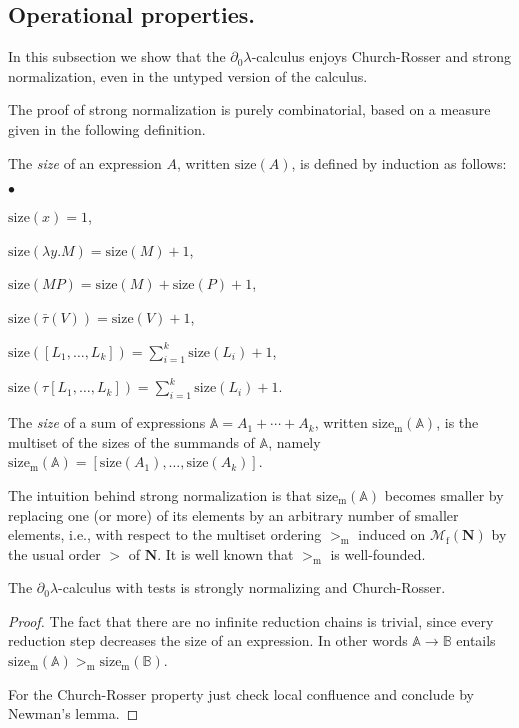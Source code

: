 \documentclass{LMCS}
\newcommand{\size}[1]{\mathrm{size}(#1)}
\newcommand\msize[1]{\mathrm{size_m}(#1)}
\newcommand{\mge}{>_{\mathrm{m}}}
\newcommand{\nat}{\mathbf{N}}
\newcommand{\bag}[1]{[#1]}
\newcommand{\dzlam}{\ensuremath{\partial_0\lambda}}
\newcommand{\lam}{\ensuremath{\lambda}}
\newcommand{\Mfin}[1]{\mathcal{M}_{\mathrm{f}}(#1)}
\newcommand{\sA}{\mathbb{A}}
\newcommand{\sB}{\mathbb{B}}
\newcommand{\gt}{\ensuremath{\tau}}
\newcommand{\gto}{\ensuremath{\bar\tau}}
\begin{document}
\subsection{Operational properties.} In this subsection we show that the  \dzlam-calculus enjoys Church-Rosser 
and strong normalization, even in the untyped version of the calculus.

The proof of strong normalization is purely combinatorial, based on a measure given in the following definition.

\begin{defi} The \emph{size} of an expression $A$, written $\size{A}$, is defined by induction as follows:
\begin{iteMize}{$\bullet$}
\item $\size{x} = 1$,
\item $\size{\lam y.M} = \size{M} +1$, 
\item $\size{MP} = \size{M} + \size{P} + 1$,
\item $\size{\gto(V)} = \size{V} + 1$,
\item $\size{\bag{L_1, \ldots, L_k}} = \sum_{i=1}^{k} \size{L_i} + 1$,
\item $\size{\gt[L_1, \ldots, L_k]} = \sum_{i=1}^{k} \size{L_i} + 1$.
\end{iteMize}
The \emph{size} of a sum of expressions $\sA=A_1+\cdots+A_k$, written $\msize{\sA}$, is the multiset of the sizes of the summands of $\sA$,
 namely $\msize{\sA} = [\size{A_1},\ldots,\size{A_k}]$.
\end{defi}

The intuition behind strong normalization is that $\msize \sA$ becomes smaller by replacing one (or more) of its elements by an arbitrary number of smaller elements, i.e.,
with respect to the multiset ordering $\mge$ induced on $\Mfin{\nat}$ by the usual order $>$ of $\nat$.
It is well known that $\mge$ is well-founded.

\begin{thm}\label{thm:CR+SN} 
The \dzlam-calculus with tests is strongly normalizing and Church-Rosser.
\end{thm}

\begin{proof} 
The fact that there are no infinite reduction chains is trivial, since every reduction step decreases the size of an expression. In other words $\sA \to \sB$ entails
 $\msize{\sA}\mge \msize{\sB}$.

For the Church-Rosser property just check local confluence and conclude by Newman's lemma.
\end{proof}
\end{document}
